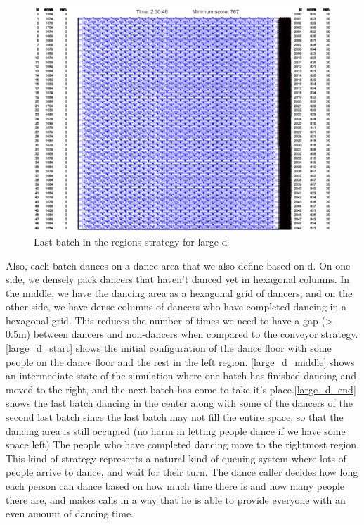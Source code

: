 \documentclass[a4paper,11pt,titlepage]{article}
\begin{document}
\begin{figure} [h]
\centering
\includegraphics[width=\textwidth]{imgs/large_d_end}
\caption{Last batch in the regions strategy for large d}
\label{large_d_end}
\end{figure}

Also, each batch dances on a dance area that we also define based on d. On one side, we densely pack dancers that haven't danced yet in hexagonal columns. In the middle, we have the dancing area as a hexagonal grid of dancers, and on the other side, we have dense columns of dancers who have completed dancing in a hexagonal grid. This reduces the number of times we need to have a gap (> 0.5m) between dancers and non-dancers when compared to the conveyor strategy. \autoref{large_d_start} shows the initial configuration of the dance floor with some people on the dance floor and the rest in the left region. \autoref{large_d_middle} shows an intermediate state of the simulation where one batch has finished dancing and moved to the right, and the next batch has come to take it's place.\autoref{large_d_end} shows the last batch dancing in the center along with some of the dancers of the second last batch since the last batch may not fill the entire space, so that the dancing area is still occupied (no harm in letting people dance if we have some space left) The people who have completed dancing move to the rightmost region. This kind of strategy represents a natural kind of queuing system where lots of people arrive to dance, and wait for their turn. The dance caller decides how long each person can dance based on how much time there is and how many people there are, and makes calls in a way that he is able to provide everyone with an even amount of dancing time.
\end{document}
